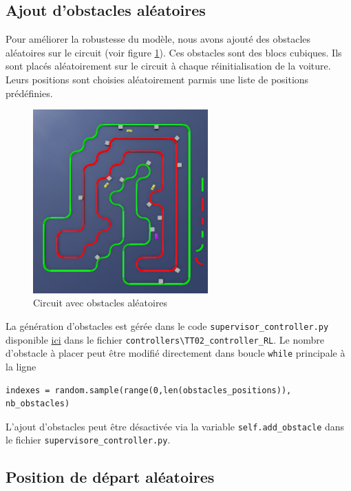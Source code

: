 \documentclass[french]{article}
\begin{document}
\subsection{Ajout d'obstacles aléatoires}

Pour améliorer la robustesse du modèle, nous avons ajouté des obstacles aléatoires sur le circuit (voir figure \ref{fig:random_obs}). Ces obstacles sont des blocs cubiques. Ils sont placés aléatoirement sur le circuit à chaque réinitialisation de la voiture. Leurs positions sont choisies aléatoirement parmis une liste de positions prédéfinies. 

\begin{figure}[H]
    \centering
    \includegraphics[width=0.6\textwidth]{Images/random_obs.png}
    \caption{Circuit avec obstacles aléatoires}
    \label{fig:random_obs}
\end{figure}

\vspace{0.5cm}
La génération d'obstacles est gérée dans le code \verb|supervisor_controller.py| disponible \href{https://github.com/basileplus/RCAutonomousCar/tree/main/simulatedCar}{ici} dans le fichier \verb|controllers\TT02_controller_RL|. Le nombre d'obstacle à placer peut être modifié directement dans boucle \verb|while| principale à la ligne
\begin{lstlisting}
indexes = random.sample(range(0,len(obstacles_positions)), nb_obstacles)
\end{lstlisting}

L'ajout d'obstacles peut être désactivée via la variable \verb|self.add_obstacle| dans le fichier \verb|supervisore_controller.py|.

\subsection{Position de départ aléatoires}
\end{document}
